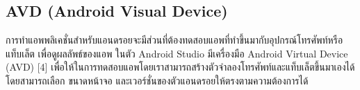 \subsection{AVD (Android Visual Device)}
การทําแอพพลิเคชั่นสําหรับแอนดรอยจะมีส่วนที่ต้องทดสอบแอพที่ทําขึ้นมากับอุปกรณ์โทรศัพท์หรือแท็บเล็ต เพื่อดูผลลัพธ์ของแอพ ในตัว Android Studio มีเครื่องมือ Android Virtual Device (AVD) [4]
เพื่อให้ในการทดสอบแอพโดยเราสามารถสร้างตัวจําลองโทรศัพท์และแท็บเล็ตขึ้นมาเองได้ โดยสามารถเลือก
ขนาดหน้าจอ และเวอร์ชั่นของตัวแอนดรอยให้ตรงตามความต้องการได้









